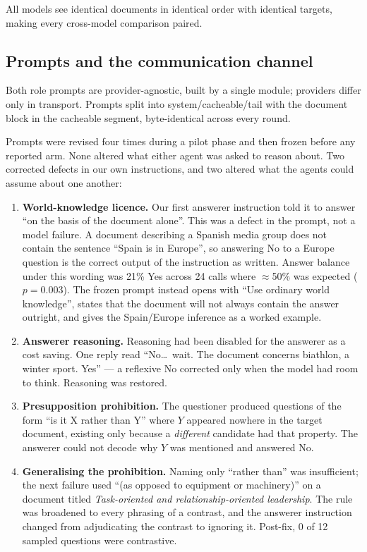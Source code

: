 \documentclass[11pt]{article}
\begin{document}
All models see identical documents in identical order with identical targets,
making every cross-model comparison paired.

\subsection{Prompts and the communication channel}
\label{sec:prompts}

Both role prompts are provider-agnostic, built by a single module; providers
differ only in transport. Prompts split into system/cacheable/tail with the
document block in the cacheable segment, byte-identical across every round.

Prompts were revised four times during a pilot phase and then frozen before any
reported arm. None altered what either agent was asked to
reason about. Two corrected defects in our own instructions, and two altered
what the agents could assume about one another:

\begin{enumerate}
\item \textbf{World-knowledge licence.} Our first answerer instruction told it
to answer ``on the basis of the document alone''. This was a defect in the
prompt, not a model failure. A document describing a Spanish media group does
not contain the sentence ``Spain is in Europe'', so answering No to a Europe
question is the correct output of the instruction as written. Answer balance
under this wording was 21\% Yes across 24 calls where $\approx$50\% was
expected ($p=0.003$). The frozen prompt instead opens with ``Use ordinary world
knowledge'', states that the document will not always contain the answer
outright, and gives the Spain/Europe inference as a worked example.
\item \textbf{Answerer reasoning.} Reasoning had been disabled for the answerer
as a cost saving. One reply read ``No\dots\ wait. The document concerns
biathlon, a winter sport. Yes'' --- a reflexive No corrected only when the model
had room to think. Reasoning was restored.
\item \textbf{Presupposition prohibition.} The questioner produced questions of
the form ``is it X rather than Y'' where $Y$ appeared nowhere in the target
document, existing only because a \emph{different} candidate had that property.
The answerer could not decode why $Y$ was mentioned and answered No.
\item \textbf{Generalising the prohibition.} Naming only ``rather than'' was
insufficient; the next failure used ``(as opposed to equipment or machinery)''
on a document titled \emph{Task-oriented and relationship-oriented leadership}.
The rule was broadened to every phrasing of a contrast, and the answerer
instruction changed from adjudicating the contrast to ignoring it. Post-fix,
0 of 12 sampled questions were contrastive.
\end{enumerate}
\end{document}
